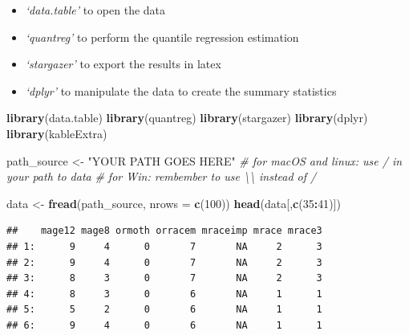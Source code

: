 \documentclass[]{book}
\newenvironment{Shaded}{\begin{snugshade}}{\end{snugshade}}
\newcommand{\KeywordTok}[1]{\textcolor[rgb]{0.13,0.29,0.53}{\textbf{#1}}}
\newcommand{\DataTypeTok}[1]{\textcolor[rgb]{0.13,0.29,0.53}{#1}}
\newcommand{\DecValTok}[1]{\textcolor[rgb]{0.00,0.00,0.81}{#1}}
\newcommand{\StringTok}[1]{\textcolor[rgb]{0.31,0.60,0.02}{#1}}
\newcommand{\CommentTok}[1]{\textcolor[rgb]{0.56,0.35,0.01}{\textit{#1}}}
\newcommand{\OperatorTok}[1]{\textcolor[rgb]{0.81,0.36,0.00}{\textbf{#1}}}
\newcommand{\NormalTok}[1]{#1}
\providecommand{\tightlist}{%
  \setlength{\itemsep}{0pt}\setlength{\parskip}{0pt}}
\begin{document}
\begin{itemize}
\tightlist
\item
  \emph{`data.table'} to open the data
\item
  \emph{`quantreg'} to perform the quantile regression estimation
\item
  \emph{`stargazer'} to export the results in latex
\item
  \emph{`dplyr'} to manipulate the data to create the summary statistics
\end{itemize}

\begin{Shaded}
\begin{Highlighting}[]
\KeywordTok{library}\NormalTok{(data.table)}
\KeywordTok{library}\NormalTok{(quantreg)}
\KeywordTok{library}\NormalTok{(stargazer)}
\KeywordTok{library}\NormalTok{(dplyr)}
\KeywordTok{library}\NormalTok{(kableExtra)}
\end{Highlighting}
\end{Shaded}

\begin{Shaded}
\begin{Highlighting}[]
\NormalTok{path_source <-}\StringTok{ "YOUR PATH GOES HERE"}
\CommentTok{# for macOS and linux: use / in your path to data}
\CommentTok{# for Win: rembember to use \textbackslash{}\textbackslash{} instead of /}
\end{Highlighting}
\end{Shaded}

\begin{Shaded}
\begin{Highlighting}[]
\NormalTok{data <-}\StringTok{ }\KeywordTok{fread}\NormalTok{(path_source, }\DataTypeTok{nrows =} \KeywordTok{c}\NormalTok{(}\DecValTok{100}\NormalTok{))}
\KeywordTok{head}\NormalTok{(data[,}\KeywordTok{c}\NormalTok{(}\DecValTok{35}\OperatorTok{:}\DecValTok{41}\NormalTok{)])}
\end{Highlighting}
\end{Shaded}

\begin{verbatim}
##    mage12 mage8 ormoth orracem mraceimp mrace mrace3
## 1:      9     4      0       7       NA     2      3
## 2:      9     4      0       7       NA     2      3
## 3:      8     3      0       7       NA     2      3
## 4:      8     3      0       6       NA     1      1
## 5:      5     2      0       6       NA     1      1
## 6:      9     4      0       6       NA     1      1
\end{verbatim}
\end{document}
